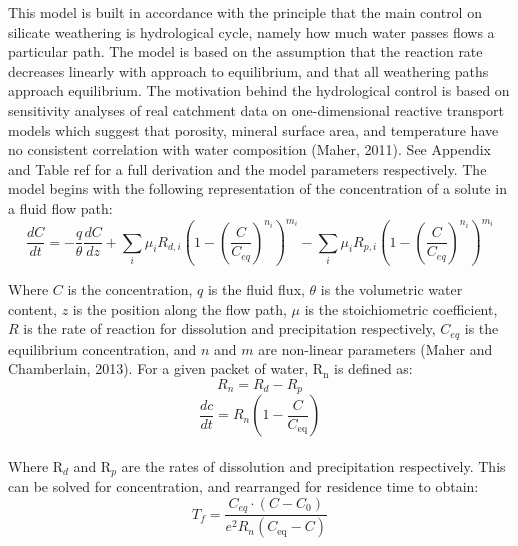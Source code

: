 This model is built in accordance with the principle that the main control on silicate weathering is hydrological cycle, namely how much water passes flows a particular path. The model is based on the assumption that the reaction rate decreases linearly with approach to equilibrium, and that all weathering paths approach equilibrium. The motivation behind the hydrological control is based on sensitivity analyses of real catchment data on one-dimensional reactive transport models which suggest that porosity, mineral surface area, and temperature have no consistent correlation with water composition (Maher, 2011). See Appendix and Table ref for a full derivation and the model parameters respectively. The model begins with the following representation of the concentration of a solute in a fluid flow path:\\ 

\begin{equation}
    \frac{dC}{dt} = -\frac{q}{\theta} \frac{dC}{dz} + \sum_i \mu_i R_{d,i} \left( 1 - \left( \frac{C}{C_{eq}} \right)^{n_i} \right)^{m_i} - \sum_i \mu_i R_{p,i} \left( 1 - \left( \frac{C}{C_{eq}} \right)^{n_i} \right)^{m_i}
\end{equation}

Where \( C \) is the concentration, \( q \) is the fluid flux, \( \theta \) is the volumetric water content, \( z \) is the position along the flow path, \( \mu \) is the stoichiometric coefficient, \( R \) is the rate of reaction for dissolution and precipitation respectively, \( C_{eq} \) is the equilibrium concentration, and \( n \) and \( m \) are non-linear parameters (Maher and Chamberlain, 2013). For a given packet of water, R$_{\text{n}}$ is defined as: \\

\begin{equation}
R_n = R_{d} - R_{p}
\end{equation} 
\begin{equation}
\frac{dc}{dt} = R_n \left( 1 - \frac{C}{C_{\text{eq}}} \right)
\end{equation} \\

Where R$_d$ and R$_p$ are the rates of dissolution and precipitation respectively. This can be solved for concentration, and rearranged for residence time to obtain:\\

\begin{equation}
    T_f = \frac{C_{eq} \cdot \left(C - C_0\right)}{e^2 R_n \left( C_{\text{eq}} - C \right)}
\end{equation}\\

